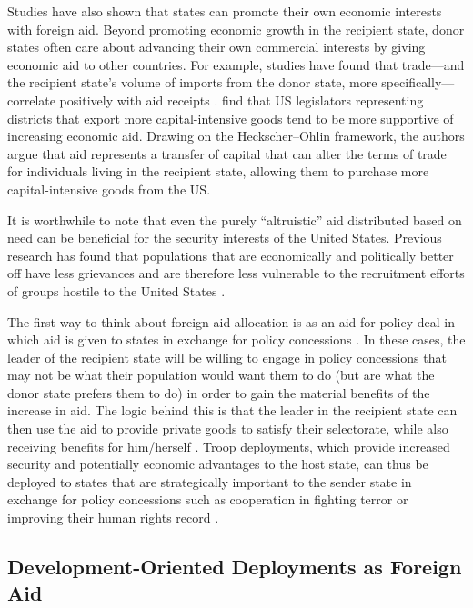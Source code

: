 \documentclass[12pt]{article}
\begin{document}
\begin{doublespace}
Studies have also shown that states can promote their own economic interests with foreign aid. Beyond promoting economic growth in the recipient state, donor states often care about advancing their own commercial interests by giving economic aid to other countries. For example, studies have found that trade---and the recipient state's volume of imports from the donor state, more specifically---correlate positively with aid receipts \cite{MKP1998,AlesinaDollar2000,bdm07}.  find that US legislators representing districts that export more capital-intensive goods tend to be more supportive of increasing economic aid. Drawing on the Heckscher--Ohlin framework, the authors argue that aid represents a transfer of capital that can alter the terms of trade for individuals living in the recipient state, allowing them to purchase more capital-intensive goods from the US.

It is worthwhile to note that even the purely ``altruistic'' aid distributed based on need can be beneficial for the security interests of the United States. Previous research has found that populations that are economically and politically better off have less grievances and are therefore less vulnerable to the recruitment efforts of groups hostile to the United States \cite{scott2011sponsoring,young2011can,Heinrichetal2016,de2005quality,finkel2007effects}.   


The first way to think about foreign aid allocation is as an aid-for-policy deal in which aid is given to states in exchange for policy concessions \cite{AlesinaDollar2000,palmer2011theory,BuenodeMesquita2005,de2007foreign}.  In these cases, the leader of the recipient state will be willing to engage in policy concessions that may not be what their population would want them to do (but are what the donor state prefers them to do) in order to gain the material benefits of the increase in aid.  The logic behind this is that the leader in the recipient state can then use the aid to provide private goods to satisfy their selectorate, while also receiving benefits for him/herself \cite{BuenodeMesquita2005,de2007foreign}.  Troop deployments, which provide increased security and potentially economic advantages to the host state, can thus be deployed to states that are strategically important to the sender state in exchange for policy concessions such as cooperation in fighting terror or improving their human rights record \cite{bell2015troops}.  




\subsection{Development-Oriented Deployments as Foreign Aid}


\end{doublespace}
\end{document}
